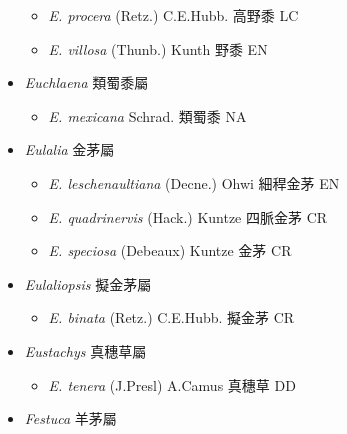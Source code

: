 \begin{itemize}
  \begin{itemize}
        \item[] \textit{E. procera} (Retz.) C.E.Hubb.  高野黍   LC
        \item[] \textit{E. villosa} (Thunb.) Kunth  野黍   EN
  \end{itemize}
 \item[] \textit{Euchlaena} 類蜀黍屬
                                
  \begin{itemize}
        \item[] \textit{E. mexicana} Schrad.  類蜀黍   NA
  \end{itemize}
 \item[] \textit{Eulalia} 金茅屬
                                
  \begin{itemize}
        \item[] \textit{E. leschenaultiana} (Decne.) Ohwi  細稈金茅   EN
        \item[] \textit{E. quadrinervis} (Hack.) Kuntze  四脈金茅   CR
        \item[] \textit{E. speciosa} (Debeaux) Kuntze  金茅   CR
  \end{itemize}
 \item[] \textit{Eulaliopsis} 擬金茅屬
                                
  \begin{itemize}
        \item[] \textit{E. binata} (Retz.) C.E.Hubb.  擬金茅   CR
  \end{itemize}
 \item[] \textit{Eustachys} 真穗草屬
                                
  \begin{itemize}
        \item[] \textit{E. tenera} (J.Presl) A.Camus  真穗草   DD
  \end{itemize}
 \item[] \textit{Festuca} 羊茅屬
                                

\end{itemize}
